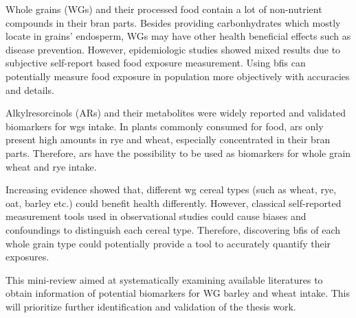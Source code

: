 Whole grains (WGs) and their processed food contain a lot of non-nutrient compounds in their bran parts. Besides providing carbonhydrates which mostly locate in grains' endosperm, WGs may have other health beneficial effects such as disease prevention. However, epidemiologic studies showed mixed results due to subjective self-report based food exposure measurement\cite{ISI:000447355100002}. Using \acrfull{bfis} can potentially measure food exposure in population more objectively with accuracies and details\cite{Scalbert2014}.

Alkylresorcinols (ARs) and their metabolites were widely reported and validated biomarkers for \acrshort{wgs} intake. 
In plants commonly consumed for food, \acrshort{ars} only present high amounts in rye and wheat, especially concentrated in their bran parts\cite{arreview2004}. Therefore, \acrshort{ars} have the possibility to be used as biomarkers for whole grain wheat and rye intake.

Increasing evidence showed that, different \acrshort{wg} cereal types (such as wheat, rye, oat, barley etc.) could benefit health differently. 
However, classical self-reported measurement tools used in observational studies could cause biases and confoundings to distinguish each cereal type.
Therefore, discovering \acrshort{bfis} of each whole grain type could potentially provide a tool to accurately quantify their exposures. 

This mini-review aimed at systematically examining available literatures to obtain information of potential biomarkers for WG barley and wheat intake. This will prioritize further identification and validation of the thesis work.